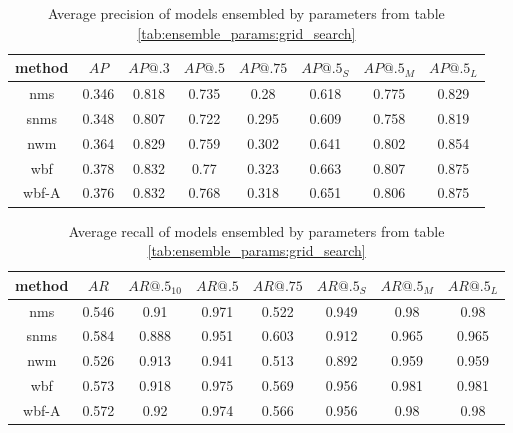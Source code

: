 \begin{table}[h]
    \centering
    \begin{tabular}{|c|c|c|c|c|c|c|c|}
        \hline
        method & $AP$  & $AP@.3$ & $AP@.5$ & $AP@.75$ & $AP@.5_S$ & $AP@.5_M$ & $AP@.5_L$ \\ \hline
        nms    & 0.346 & 0.818   & 0.735   & 0.28     & 0.618     & 0.775     & 0.829     \\ \hline
        snms   & 0.348 & 0.807   & 0.722   & 0.295    & 0.609     & 0.758     & 0.819     \\ \hline
        nwm    & 0.364 & 0.829   & 0.759   & 0.302    & 0.641     & 0.802     & 0.854     \\ \hline
        wbf    & 0.378 & 0.832   & 0.77    & 0.323    & 0.663     & 0.807     & 0.875     \\ \hline
        wbf-A  & 0.376 & 0.832   & 0.768   & 0.318    & 0.651     & 0.806     & 0.875     \\ \hline
    \end{tabular}
    \caption{Average precision of models ensembled by parameters from table \ref{tab:ensemble_params:grid_search}}
    \label{tab:precision:grid_search}
\end{table}


\begin{table}[h]
    \centering
    \begin{tabular}{|c|c|c|c|c|c|c|c|}
        \hline
        method & $AR$  & $AR@.5_{10}$ & $AR@.5$ & $AR@.75$ & $AR@.5_S$ & $AR@.5_M$ & $AR@.5_L$ \\ \hline
        nms    & 0.546 & 0.91         & 0.971   & 0.522    & 0.949     & 0.98      & 0.98      \\ \hline
        snms   & 0.584 & 0.888        & 0.951   & 0.603    & 0.912     & 0.965     & 0.965     \\ \hline
        nwm    & 0.526 & 0.913        & 0.941   & 0.513    & 0.892     & 0.959     & 0.959     \\ \hline
        wbf    & 0.573 & 0.918        & 0.975   & 0.569    & 0.956     & 0.981     & 0.981     \\ \hline
        wbf-A  & 0.572 & 0.92         & 0.974   & 0.566    & 0.956     & 0.98      & 0.98      \\ \hline
    \end{tabular}
    \caption{Average recall of models ensembled by parameters from table \ref{tab:ensemble_params:grid_search}}
    \label{tab:recall:grid_search}
\end{table}


